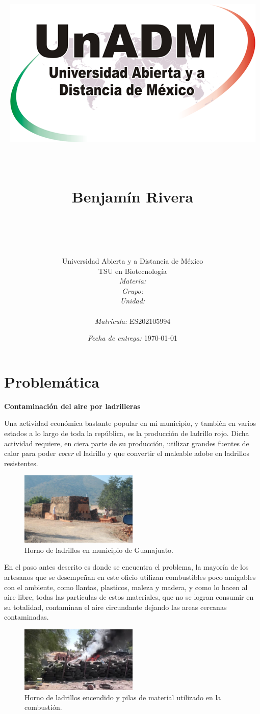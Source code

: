 \documentclass[12pt]{article}
\title{
	\includegraphics{../../../assets/logo-unadm.png} \\
	\ \\\ \\Benjam\'in Rivera \\
	\bf{\titulo}\\\ \\}
\author{
	Universidad Abierta y a Distancia de México \\
	TSU en Biotecnolog\'ia \\
	\textit{Materia:} \materia \\
	\textit{Grupo:} \grupo \\
	\textit{Unidad:} \unidad \\
	\\
	\textit{Matricula:} ES202105994 }
\date{\textit{Fecha de entrega:} \today}
\begin{document}
\maketitle\newpage

\section*{Problem\'atica}
	\begin{center}\par\bf\huge Contaminaci\'on del aire por ladrilleras
	\end{center}
	
	\par Una actividad econ\'omica bastante popular en mi municipio, y tambi\'en en varios estados a lo largo de toda la rep\'ublica, es la producci\'on de ladrillo rojo. Dicha actividad requiere, en ciera parte de su producci\'on, utilizar grandes fuentes de calor para poder \textit{cocer} el ladrillo y que convertir el maleable adobe en ladrillos resistentes. 
	
\begin{figure}[h]
	\centering
	\includegraphics [width=0.5\textwidth] {quema_ladrillos.jpg}
	\caption{Horno de ladrillos en municipio de Guanajuato.}
\end{figure}

	\par En el paso antes descrito es donde se encuentra el problema, la mayor\'ia de los artesanos que se desempe\~nan en este oficio utilizan combustibles poco amigables con el ambiente, como llantas, plasticos, maleza y madera, y como lo hacen al aire libre, todas las particulas de estos materiales, que no se logran consumir en su totalidad, contaminan el aire circundante dejando las areas cercanas contaminadas.
	
\begin{figure}[h]
	\centering
	\includegraphics [width=0.5\textwidth] {fuego_ladrillos.jpg}
	\caption{Horno de ladrillos encendido y pilas de material utilizado en la combusti\'on.}
\end{figure}
\end{document}
